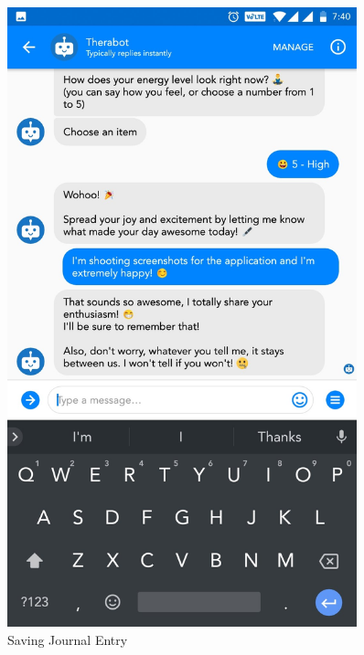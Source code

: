 \begin{figure}[H]
\begin{minipage}{0.45\textwidth}
        \includegraphics[width=0.9\textwidth]{images/screenshots/chatbot/4.jpg}
        \caption{Saving Journal Entry}
    \end{minipage}
\end{figure}
\vspace*{\fill}

\pagebreak

